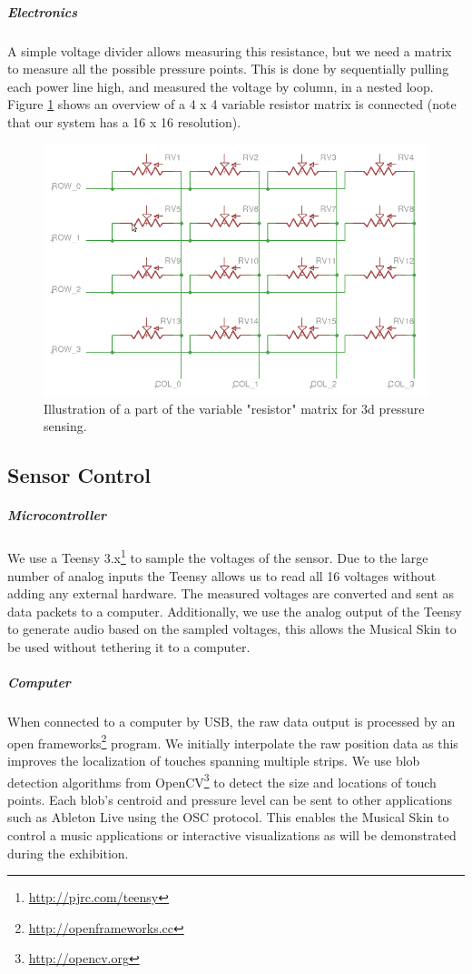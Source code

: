 \documentclass{sigchi-ext}
\begin{document}
\subparagraph{Electronics}
A simple voltage divider allows measuring this resistance, but we need a matrix to measure all the possible pressure points.
This is done by sequentially pulling each power line high, and measured the voltage by column, in a nested loop.
Figure \ref{fig:matrix} shows an overview of a 4 x 4 variable resistor matrix is connected (note that our system has a 16 x 16 resolution).

\begin{figure}
    \centering
    \includegraphics[width=\columnwidth]{figures/matrix}
    \caption{Illustration of a part of the variable "resistor" matrix for 3d pressure sensing.}\label{fig:matrix}
\end{figure}



\subsection{Sensor Control}
\subparagraph{Microcontroller}

We use a Teensy 3.x\footnote{\url{http://pjrc.com/teensy}} to sample the voltages of the sensor. Due to the large number of analog inputs the Teensy allows us to read all 16 voltages without adding any external hardware.
The measured voltages are converted and sent as data packets to a computer. Additionally, we use the analog output of the Teensy to generate audio based on the sampled voltages, this allows the Musical Skin to be used without tethering it to a computer.

\subparagraph{Computer}
When connected to a computer by USB, the raw data output is processed by an open frameworks\footnote{\url{http://openframeworks.cc}} program. We initially interpolate the raw position data as this improves the localization of touches spanning multiple strips. We use blob detection algorithms from OpenCV\footnote{\url{http://opencv.org}} to detect the size and locations of touch points. Each blob's centroid and pressure level can be sent to other applications such as Ableton Live using the OSC protocol. This enables the Musical Skin to control a music applications or interactive visualizations as will be demonstrated during the exhibition.
\end{document}
